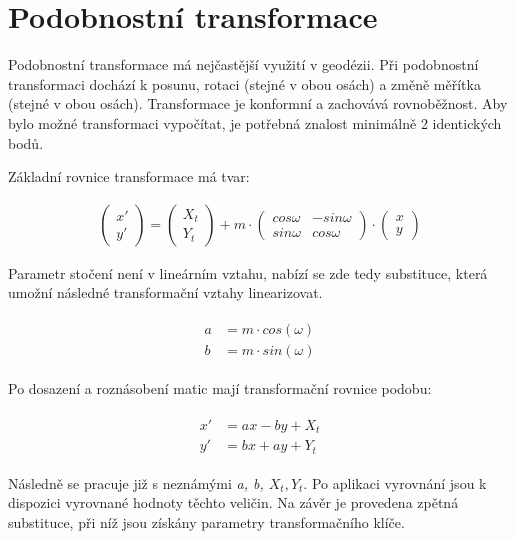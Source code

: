 \documentclass[thesis=M,czech]{FITthesis}[2012/06/26]
\begin{document}
\section{Podobnostní transformace}
Podobnostní transformace má nejčastější využití v geodézii. Při podobnostní transformaci dochází k posunu, rotaci (stejné v obou osách) a změně měřítka (stejné v obou osách). Transformace je konformní a zachovává rovnoběžnost. Aby bylo možné transformaci vypočítat, je potřebná znalost minimálně 2 identických bodů. 

Základní rovnice transformace má tvar:

\begin{align} \label{podob}
\begin{pmatrix}
x'\\ 
y'
\end{pmatrix} = 
\begin{pmatrix}
X_t\\ 
Y_t
\end{pmatrix} +
m\cdot \begin{pmatrix}
cos\omega  & -sin\omega\\ 
sin\omega & cos\omega
\end{pmatrix}\cdot 
\begin{pmatrix}
x\\ 
y
\end{pmatrix}
\end{align}

Parametr stočení není v lineárním vztahu, nabízí se zde tedy substituce, která umožní následné transformační vztahy linearizovat.

\begin{align}  \label{podobn} 
\begin{split}
a &= m \cdot cos(\omega) \\
b &= m \cdot sin(\omega) 
\end{split}
\end{align}


Po dosazení a roznásobení matic mají transformační rovnice podobu:

 \begin{align}  \label{podobn_sub} 
\begin{split}
x' &= ax - by + X_t \\
y' &= bx + ay + Y_t
\end{split}
\end{align}

Následně se pracuje již s neznámými \textit{a, b, $X_t, Y_t$}. Po aplikaci vyrovnání jsou k dispozici vyrovnané hodnoty těchto veličin. Na závěr je provedena zpětná substituce, při níž jsou získány parametry transformačního klíče.
\end{document}
